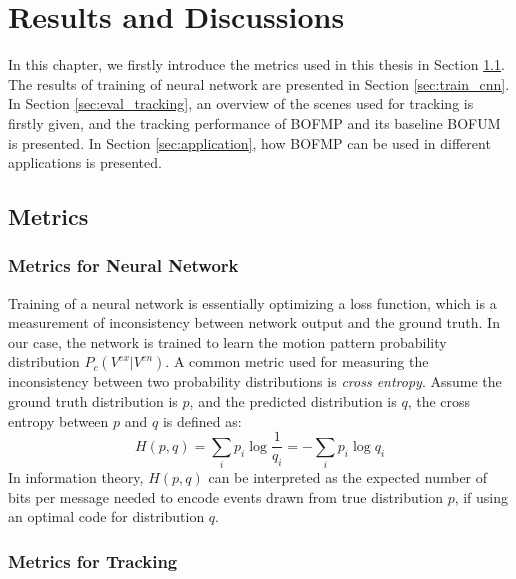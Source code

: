 \chapter{Results and Discussions} \label{chapter:5}

In this chapter, we firstly introduce the metrics used in this thesis in Section \ref{sec:metrics}. The results of training of neural network are presented in Section \ref{sec:train_cnn}. In Section \ref{sec:eval_tracking}, an overview of the scenes used for tracking is firstly given, and the tracking performance of BOFMP and its baseline BOFUM is presented. In Section \ref{sec:application}, how BOFMP can be used in different applications is presented. 

\section{Metrics} \label{sec:metrics}

\subsection{Metrics for Neural Network}

Training of a neural network is essentially optimizing a loss function, which is a measurement of inconsistency between network output and the ground truth. In our case, the network is trained to learn the motion pattern probability distribution $P_c(V^{ex}|V^{en})$. A common metric used for measuring the inconsistency between two probability distributions is \textit{cross entropy}. Assume the ground truth distribution is $p$, and the predicted distribution is $q$, the cross entropy between $p$ and $q$ is defined as:
\begin{equation}
H(p, q) = \sum_i p_i \log \frac{1}{q_i} = - \sum_i p_i \log q_i
\end{equation}
In information theory, $H(p, q)$ can be interpreted as the expected number of bits per message needed to encode events drawn from true distribution $p$, if using an optimal code for distribution $q$.

\subsection{Metrics for Tracking}

